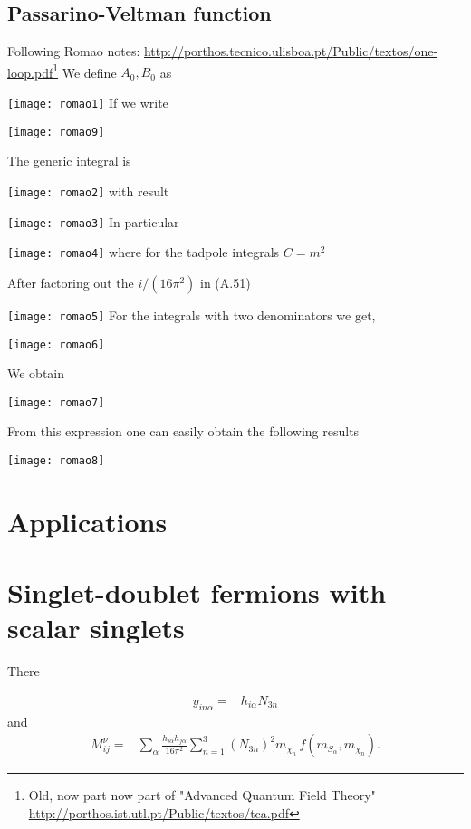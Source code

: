 \subsection{Passarino-Veltman function}
Following Romao notes: \url{http://porthos.tecnico.ulisboa.pt/Public/textos/one-loop.pdf}\footnote{Old, now part now part of "Advanced Quantum Field Theory" \url{http://porthos.ist.utl.pt/Public/textos/tca.pdf}} We define $A_0, B_0$ as

\texttt{[image: romao1]}
If we write

\texttt{[image: romao9]}

The generic integral is 

\texttt{[image: romao2]}
with result

\texttt{[image: romao3]}
In particular

\texttt{[image: romao4]}
where for the tadpole integrals $C=m^2$

After factoring out the $i/\left( 16\pi^2 \right)$ in (A.51)

\texttt{[image: romao5]}
For the integrals with two denominators we get,

\texttt{[image: romao6]}

We obtain

\texttt{[image: romao7]}

From this expression one can easily obtain the following results

\texttt{[image: romao8]}






\section{Applications}

\section{Singlet-doublet fermions with scalar singlets}
There~\cite{Restrepo:2015ura}

\begin{align}
  y_{i n\alpha}=&h_{i\alpha}N_{3n} 
\end{align}
and 
\begin{align}
   M^{\nu}_{ij}=&\sum_{\alpha}\frac{h_{i\alpha}h_{j\alpha}}{16\pi^2}\sum_{n=1}^3 \left( N_{3n} \right)^2m_{\chi_n}
\,f\left( m_{S_\alpha},m_{\chi_n} \right).
\end{align}

